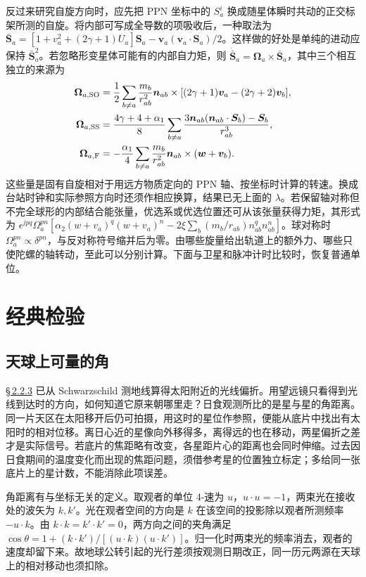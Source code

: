 反过来研究自旋方向时，应先把 PPN 坐标中的 $S_a^i$ 换成随星体瞬时共动的正交标架所测的自旋。将内部可写成全导数的项吸收后，一种取法为
$\bar{\bm S}_a=[1+v_a^2+(2\gamma+1)U_a]\bm S_a
 -\bm v_a(\bm v_a\cdot\bm S_a)/2$。这样做的好处是单纯的进动应保持 $\bar{\bm S}_a^2$。若忽略形变星体可能有的内部自力矩，则 $\dot{\bar{\bm S}}_a=\bm\Omega_a\times\bar{\bm S}_a$，其中三个相互独立的来源为
\begin{align*}
 \bm\Omega_{a,{\rm SO}}&=\frac12\sum_{b\ne a}\frac{m_b}{r_{ab}^2}
 \bm n_{ab}\times[(2\gamma+1)\bm v_a-(2\gamma+2)\bm v_b],\\
 \bm\Omega_{a,{\rm SS}}&=\frac{4\gamma+4+\alpha_1}{8}
  \sum_{b\ne a}\frac{3\bm n_{ab}(\bm n_{ab}\cdot\bm S_b)-\bm S_b}{r_{ab}^3},\\
 \bm\Omega_{a,{\rm F}}&=-\frac{\alpha_1}{4}\sum_{b\ne a}\frac{m_b}{r_{ab}^2}
                  \bm n_{ab}\times(\bm w+\bm v_b).
\end{align*}
这些量是固有自旋相对于用远方物质定向的 PPN 轴、按坐标时计算的转速。换成台站时钟和实际参照方向时还须作相应换算，结果已无上面的 $\lambda$。若保留轴对称但不完全球形的内部结合能张量，优选系或优选位置还可从该张量获得力矩，其形式为 $\epsilon^{jpq}\Omega_a^{pn}[\alpha_2(w+v_a)^q(w+v_a)^n-2\xi\sum_b(m_b/r_{ab})n_{ab}^qn_{ab}^n]$。球对称时 $\Omega_a^{pn}\propto\delta^{pn}$，与反对称符号缩并后为零。由哪些旋量给出轨道上的额外力、哪些只使陀螺的轴转动，至此可以分别计算。下面与卫星和脉冲计时比较时，恢复普通单位。

\section{经典检验}

\subsection{天球上可量的角}

\hyperlink{subsection.2.2.3}{\S\,2.2.3} 已从 Schwarzschild 测地线算得太阳附近的光线偏折。用望远镜只看得到光线到达时的方向，如何知道它原来朝哪里走？日食观测所比的是星与星的角距离。同一片天区在太阳移开后仍可拍摄，用这时的星位作参照，便能从底片中找出有太阳时的相对位移。离日心近的星像向外移得多，离得远的也在移动，两星偏折之差才是实际信号。若底片的焦距略有改变，各星距片心的距离也会同时伸缩。过去因日食期间的温度变化而出现的焦距问题，须借参考星的位置独立标定；多给同一张底片上的星计数，不能消除此项误差。

角距离有与坐标无关的定义。取观者的单位 4-速为 $u$，$u\cdot u=-1$，两束光在接收处的波矢为 $k,k'$。光在观者空间的方向是 $k$ 在该空间的投影除以观者所测频率 $-u\cdot k$。由 $k\cdot k=k'\cdot k'=0$，两方向之间的夹角满足 $\cos\theta=1+(k\cdot k')/[(u\cdot k)(u\cdot k')]$。归一化时两束光的频率消去，观者的速度却留下来。故地球公转引起的光行差须按观测日期改正，同一历元两源在天球上的相对移动也须扣除。

